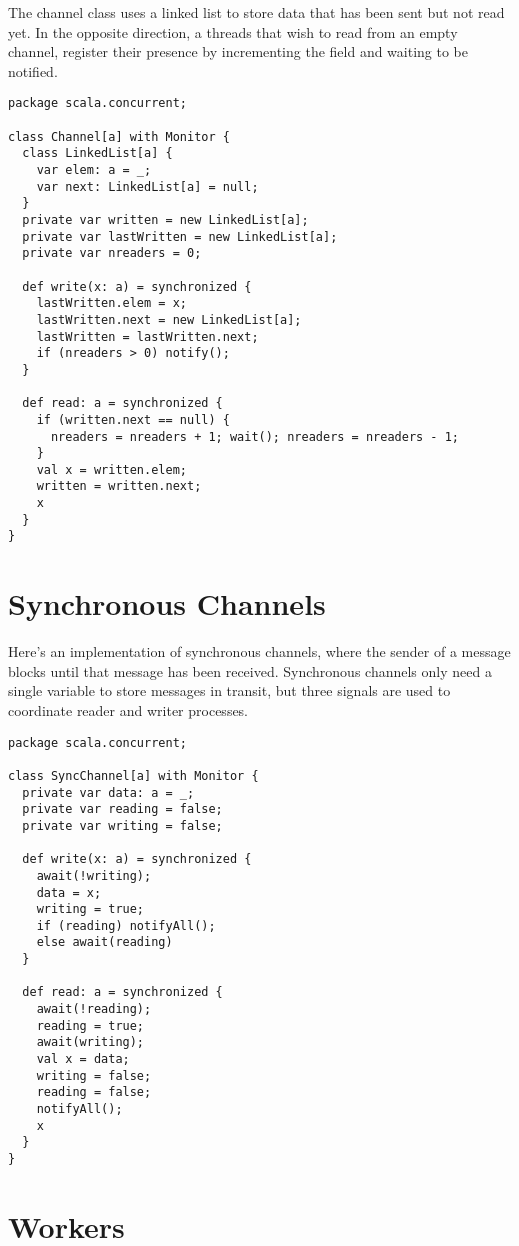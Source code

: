 \documentclass[a4paper,12pt,twoside,titlepage]{book}
\begin{document}
{The channel class uses a linked list to store data that has been sent
but not read yet. In the opposite direction, a threads that
wish to read from an empty channel, register their presence by
incrementing the  field and waiting to be notified.
\begin{lstlisting}
package scala.concurrent;

class Channel[a] with Monitor {
  class LinkedList[a] {
    var elem: a = _;
    var next: LinkedList[a] = null;
  }
  private var written = new LinkedList[a];
  private var lastWritten = new LinkedList[a];
  private var nreaders = 0;

  def write(x: a) = synchronized {
    lastWritten.elem = x;
    lastWritten.next = new LinkedList[a];
    lastWritten = lastWritten.next;
    if (nreaders > 0) notify();
  }

  def read: a = synchronized {
    if (written.next == null) {
      nreaders = nreaders + 1; wait(); nreaders = nreaders - 1;
    }
    val x = written.elem;
    written = written.next;
    x
  }
}
\end{lstlisting}

\section{Synchronous Channels}

Here's an implementation of synchronous channels, where the sender of
a message blocks until that message has been received. Synchronous
channels only need a single variable to store messages in transit, but
three signals are used to coordinate reader and writer processes.
\begin{lstlisting}
package scala.concurrent;

class SyncChannel[a] with Monitor {
  private var data: a = _;
  private var reading = false;
  private var writing = false;

  def write(x: a) = synchronized {
    await(!writing);
    data = x;
    writing = true;
    if (reading) notifyAll();
    else await(reading)
  }

  def read: a = synchronized {
    await(!reading);
    reading = true;
    await(writing);
    val x = data;
    writing = false;
    reading = false;
    notifyAll();
    x
  }
}
\end{lstlisting}

\section{Workers}

}
\end{document}
